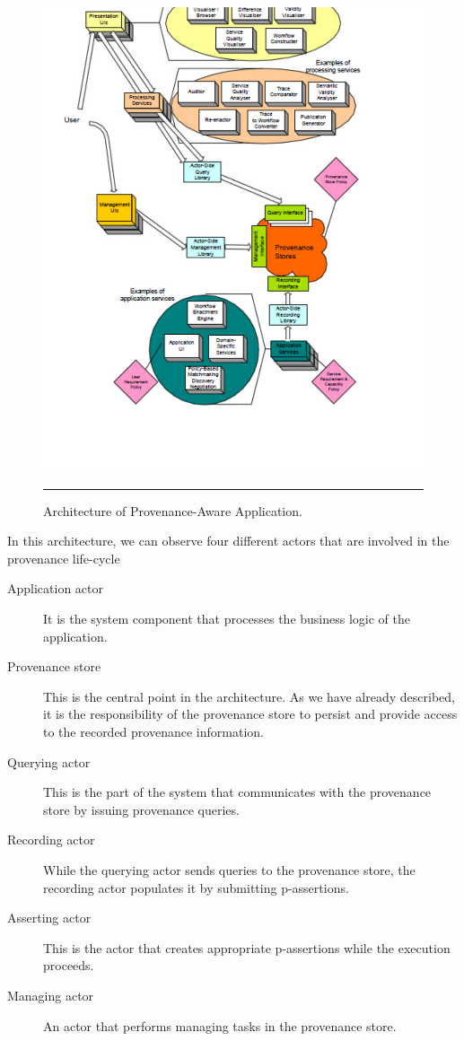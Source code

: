 \begin{figure}[htbp]
	\centering
		\includegraphics[scale=0.80]{./Figures/chapter2/figure5.pdf}
		\rule{35em}{0.5pt}
	\caption[Architecture of Provenance-Aware Application]{Architecture of Provenance-Aware Application.\cite{reference10}}
	\label{fig:provArch}
\end{figure}

In this architecture, we can observe four different actors that are involved in the provenance life-cycle

\begin{description}
  \item[Application actor]
        It is the system component that processes the business logic of the application.
  \item[Provenance store]
        This is the central point in the architecture. As we have already described, it is the responsibility of the provenance store to persist and provide access to the recorded provenance information.
  \item[Querying actor]
        This is the part of the system that communicates with the provenance store by issuing provenance queries.
  \item[Recording actor]
        While the querying actor sends queries to the provenance store, the recording actor populates it by submitting p-assertions.
  \item[Asserting actor]
        This is the actor that creates appropriate p-assertions while the execution proceeds.
  \item[Managing actor]
        An actor that performs managing tasks in the provenance store.
\end{description}

